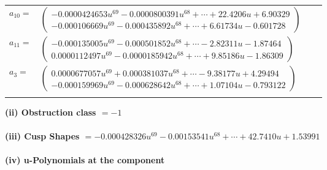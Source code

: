 \documentclass[1p]{elsarticle_modified}
\theoremstyle{definition}
\begin{document}
\begin{tabular}{m{7pt} m{180pt} m{7pt} m{180pt} }
\flushright $a_{10}=$&$\begin{pmatrix}-0.0000424653 u^{69}-0.0000800391 u^{68}+\cdots+22.4206 u+6.90329\\-0.000106669 u^{69}-0.000435892 u^{68}+\cdots+6.61734 u-0.601728\end{pmatrix}$ \\
\flushright $a_{11}=$&$\begin{pmatrix}-0.000135005 u^{69}-0.000501852 u^{68}+\cdots-2.82311 u-1.87464\\0.0000112497 u^{69}-0.0000185942 u^{68}+\cdots+9.85186 u-1.86309\end{pmatrix}$ \\
\flushright $a_{3}=$&$\begin{pmatrix}0.0000677057 u^{69}+0.000381037 u^{68}+\cdots-9.38177 u+4.29494\\-0.000159969 u^{69}-0.000628642 u^{68}+\cdots+1.07104 u-0.793122\end{pmatrix}$\\&\end{tabular}
\flushleft \textbf{(ii) Obstruction class $= -1$}\\~\\
\flushleft \textbf{(iii) Cusp Shapes $= -0.000428326 u^{69}-0.00153541 u^{68}+\cdots+42.7410 u+1.53991$}\\~\\
\newpage\renewcommand{\arraystretch}{1}
\flushleft \textbf{(iv) u-Polynomials at the component}\newline \\
\end{document}
